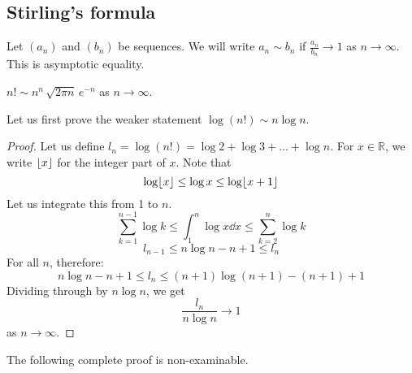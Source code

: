 \subsection{Stirling's formula}
Let \((a_n)\) and \((b_n)\) be sequences.
We will write \(a_n \sim b_n\) if \(\frac{a_n}{b_n} \to 1\) as \(n \to \infty\).
This is asymptotic equality.
\begin{theorem}
	\(n!
	\sim n^n\, \sqrt{2 \pi n}\, e^{-n}\) as \(n \to \infty\).
\end{theorem}
\noindent Let us first prove the weaker statement \(\log (n!) \sim n \log n\).
\begin{proof}
	Let us define \(l_n = \log (n!) = \log 2 + \log 3 + \dots + \log n\).
	For \(x \in \mathbb R\), we write \(\lfloor x\rfloor\) for the integer part of \(x\).
	Note that
	\[
		\log \lfloor x\rfloor \leq \log x \leq \log \lfloor x+1\rfloor
	\]
	Let us integrate this from 1 to \(n\).
	\[
		\sum_{k=1}^{n-1} \log k \leq \int_1^n \log x\dd{x} \leq \sum_{k=2}^{n} \log k
	\]
	\[
		l_{n-1} \leq n \log n - n + 1 \leq l_n
	\]
	For all \(n\), therefore:
	\[
		n \log n - n + 1 \leq l_n \leq (n+1) \log (n+1) - (n+1) + 1
	\]
	Dividing through by \(n\log n\), we get
	\[
		\frac{l_n}{n \log n} \to 1
	\]
	as \(n \to \infty\).
\end{proof}
\noindent The following complete proof is non-examinable.
